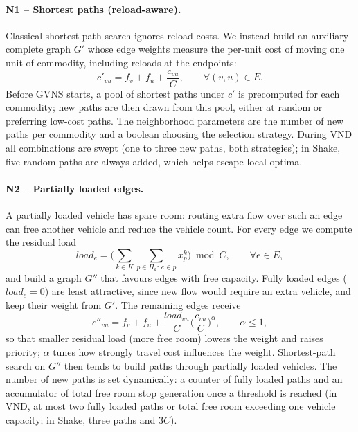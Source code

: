 \documentclass[runningheads]{llncs}
\newcommand{\E}{E}
\begin{document}
\paragraph{N1 -- Shortest paths (reload-aware).}
Classical shortest-path search ignores reload costs. We instead build an
auxiliary complete graph $G'$ whose edge weights measure the per-unit cost of
moving one unit of commodity, including reloads at the endpoints:
\begin{equation}
c'_{vu}=f_v+f_u+\frac{c_{vu}}{C}, \qquad \forall (v,u)\in \E .
\end{equation}
Before GVNS starts, a pool of shortest paths under $c'$ is precomputed for
each commodity; new paths are then drawn from this pool, either at random or
preferring low-cost paths. The neighborhood parameters are the number of new
paths per commodity and a boolean choosing the selection strategy. During VND
all combinations are swept (one to three new paths, both strategies); in Shake,
five random paths are always added, which helps escape local optima.

\paragraph{N2 -- Partially loaded edges.}
A partially loaded vehicle has spare room: routing extra flow over such an edge
can free another vehicle and reduce the vehicle count. For every edge we
compute the residual load
\begin{equation}
load_e=\Big(\sum_{k\in K}\sum_{p\in\Pi_k:\,e\in p} x^k_p\Big) \bmod C,
\qquad \forall e\in \E,
\end{equation}
and build a graph $G''$ that favours edges with free capacity. Fully loaded
edges ($load_e=0$) are least attractive, since new flow would require an extra
vehicle, and keep their weight from $G'$. The remaining edges receive
\begin{equation}
c''_{vu}=f_v+f_u+\frac{load_{vu}}{C}\Big(\frac{c_{vu}}{C}\Big)^{\!\alpha},
\qquad \alpha\le 1,
\end{equation}
so that smaller residual load (more free room) lowers the weight and raises
priority; $\alpha$ tunes how strongly travel cost influences the weight.
Shortest-path search on $G''$ then tends to build paths through
partially loaded vehicles. The number of new paths is set dynamically: a
counter of fully loaded paths and an accumulator of total free room stop
generation once a threshold is reached (in VND, at most two fully loaded paths
or total free room exceeding one vehicle capacity; in Shake, three paths and
$3C$).
\end{document}
